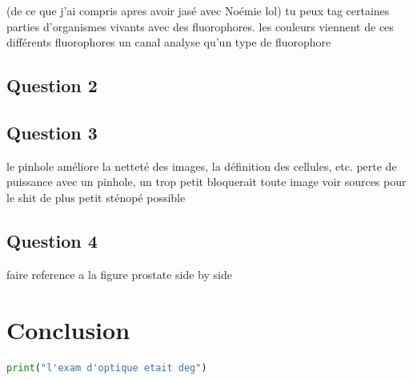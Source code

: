 \documentclass[11pt,letterpaper]{article}
\begin{document}

(de ce que j'ai compris apres avoir jasé avec Noémie lol)
tu peux tag certaines parties d'organismes vivants avec des fluorophores.
les couleurs viennent de ces différents fluorophores
un canal analyse qu'un type de fluorophore

\subsection{Question 2}


\subsection{Question 3}


le pinhole améliore la netteté des images, la définition des cellules, etc.
perte de puissance avec un pinhole, un trop petit bloquerait toute image
voir sources pour le shit de plus petit sténopé possible  

\subsection{Question 4}


faire reference a la figure prostate side by side

\section{Conclusion}


\begin{lstlisting}[language=python]
print("l'exam d'optique etait deg")
\end{lstlisting}



\clearpage

% 
% 
\end{document}
